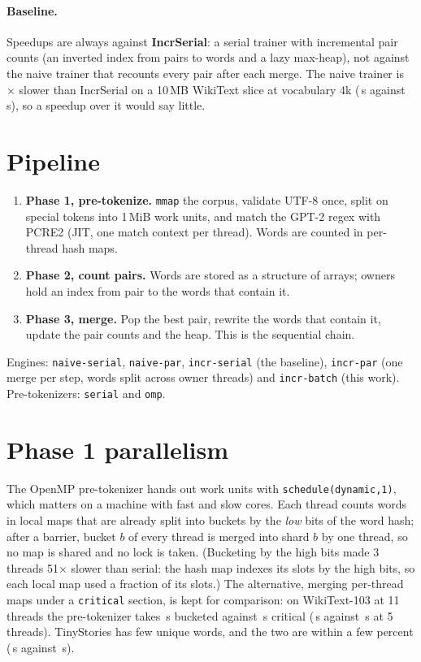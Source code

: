 \documentclass[11pt,a4paper]{article}
\newcommand{\code}[1]{\texttt{#1}}
\newcommand{\x}{$\times$}
\begin{document}
\paragraph{Baseline.} Speedups are always against \textbf{IncrSerial}: a serial trainer with incremental pair counts
(an inverted index from pairs to words and a lazy max-heap), not against the naive trainer that recounts every pair after
each merge. The naive trainer is \wtNaiveRatio\x{} slower than IncrSerial on a 10\,MB WikiText slice at vocabulary 4k
(\wtNaiveSec\,s against \wtIncrSec\,s), so a speedup over it would say little.

\section{Pipeline}

\begin{enumerate}
\item \textbf{Phase 1, pre-tokenize.} \code{mmap} the corpus, validate UTF-8 once, split on special tokens into
  1\,MiB work units, and match the GPT-2 regex with PCRE2 (JIT, one match context per thread). Words are counted in
  per-thread hash maps.
\item \textbf{Phase 2, count pairs.} Words are stored as a structure of arrays; owners hold an index from pair to the
  words that contain it.
\item \textbf{Phase 3, merge.} Pop the best pair, rewrite the words that contain it, update the pair counts and the
  heap. This is the sequential chain.
\end{enumerate}

Engines: \code{naive-serial}, \code{naive-par}, \code{incr-serial} (the baseline), \code{incr-par} (one merge per
step, words split across owner threads) and \code{incr-batch} (this work). Pre-tokenizers: \code{serial} and \code{omp}.

\section{Phase 1 parallelism}

The OpenMP pre-tokenizer hands out work units with \code{schedule(dynamic,1)}, which matters on a machine with fast and
slow cores. Each thread counts words in local maps that are already split into buckets by the \emph{low} bits of the
word hash; after a barrier, bucket $b$ of every thread is merged into shard $b$ by one thread, so no map is shared and no
lock is taken. (Bucketing by the high bits made 3 threads 51\x{} slower than serial: the hash map indexes its slots by
the high bits, so each local map used a fraction of its slots.) The alternative, merging per-thread maps under a
\code{critical} section, is kept for comparison: on WikiText-103 at 11 threads the pre-tokenizer takes \wtRedBucketEleven\,s
bucketed against \wtRedCritEleven\,s critical (\wtRedBucketFive\,s against \wtRedCritFive\,s at 5 threads). TinyStories has
few unique words, and the two are within a few percent (\tsRedBucketEleven\,s against \tsRedCritEleven\,s).
\end{document}
